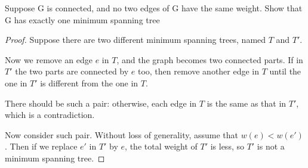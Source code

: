 


\begin{thm}{}{}
    Suppose G is connected, and no two edges of G have the same weight. Show that G has exactly one minimum spanning tree
\end{thm}
\begin{proof}[Proof]
    Suppose there are two different minimum spanning trees, named $T$ and $T'$. 

    Now we remove an edge $e$ in $T$, and the graph becomes two connected parts. 
    If in $T'$ the two parts are connected by $e$ too, 
    then remove another edge in $T$ until the one in $T'$ is different from the one in $T$. 

    There should be such a pair: otherwise, each edge in $T$ is the same as that in $T'$, which is a contradiction. 

    Now consider such pair. Without loss of generality, assume that $w(e)<w(e')$. 
    Then if we replace $e'$ in $T'$ by $e$, the total weight of $T'$ is less, so $T'$ is not a minimum spanning tree. 
\end{proof}
